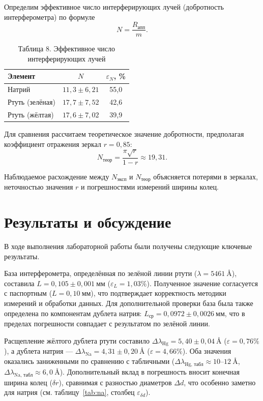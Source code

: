\documentclass[a4paper]{article}
\begin{document}
\begin{enumerate}
Определим эффективное число интерферирующих лучей (добротность интерферометра) по формуле
\[
N = \frac{R_{\text{апп}}}{m}.
\]

\begin{table}[h!]
    \centering
    \begin{tabular}{|l|c|c|}
        \hline
        Элемент & $N$ & $\varepsilon_{N}$, \% \\ \hline
        Натрий & $11{,}3 \pm 6{,}21$ & 55{,}0 \\ \hline
        Ртуть (зелёная) & $17{,}7 \pm 7{,}52$ & 42{,}6 \\ \hline
        Ртуть (жёлтая) & $17{,}6 \pm 7{,}02$ & 39{,}9 \\ \hline
    \end{tabular}
    \caption{Таблица 8. Эффективное число интерферирующих лучей}
    \label{tab:n}
\end{table}

Для сравнения рассчитаем теоретическое значение добротности, предполагая коэффициент отражения зеркал $r = 0{,}85$:
\[
N_{\text{теор}} = \frac{\pi \sqrt{r}}{1 - r} \approx 19{,}31.
\]

Наблюдаемое расхождение между $N_{\text{эксп}}$ и $N_{\text{теор}}$ объясняется потерями в зеркалах, неточностью значения $r$ и погрешностями измерений ширины колец.
\end{enumerate}

\section{Результаты и обсуждение}

В ходе выполнения лабораторной работы были получены следующие ключевые результаты.

База интерферометра, определённая по зелёной линии ртути ($\lambda = 5461~\text{\AA}$), составила $L = 0{,}105 \pm 0{,}001~\text{мм}$ ($\varepsilon_L = 1{,}03\%$). Полученное значение согласуется с паспортным ($L = 0{,}10~\text{мм}$), что подтверждает корректность методики измерений и обработки данных. Для дополнительной проверки база была также определена по компонентам дублета натрия: $L_\text{ср} = 0{,}0972 \pm 0{,}0026~\text{мм}$, что в пределах погрешности совпадает с результатом по зелёной линии.

Расщепление жёлтого дублета ртути составило $\Delta\lambda_{\text{Hg}} = 5{,}40 \pm 0{,}04~\text{\AA}$ ($\varepsilon = 0{,}76\%$), а дублета натрия — $\Delta\lambda_{\text{Na}} = 4{,}31 \pm 0{,}20~\text{\AA}$ ($\varepsilon = 4{,}66\%$). Оба значения оказались заниженными по сравнению с табличными ($\Delta\lambda_{\text{Hg, табл}} \approx 10\text{--}12~\text{\AA}$, $\Delta\lambda_{\text{Na, табл}} \approx 6{,}0~\text{\AA}$). Дополнительный вклад в погрешность вносит конечная ширина колец ($\delta r$), сравнимая с разностью диаметров $\Delta d$, что особенно заметно для натрия (см. таблицу~\ref{tab:na}, столбец $\varepsilon_{\delta d}$).
\end{document}
